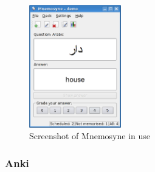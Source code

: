 \begin{figure}[h!]
\includegraphics[width=4cm]{img/mnemosyne_screen.png}
\caption{Screenshot of Mnemosyne in use}
\end{figure}

\subsubsection*{Anki}

